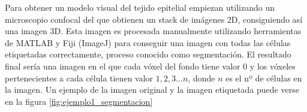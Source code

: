 
Para obtener un modelo visual del tejido epitelial empiezan utilizando un microscopio confocal del que obtienen un stack de imágenes 2D, consiguiendo así una imagen 3D. Esta imagen es procesada manualmente utilizando herramientas de MATLAB y Fiji (ImageJ) para conseguir una imagen con todas las células etiquetadas correctamente, proceso conocido como segmentación. El resultado final sería una imagen en el que cada vóxel del fondo tiene valor 0 y los vóxeles pertenecientes a cada célula tienen valor $1,2,3...n$, donde $n$ es el nº de células en la imagen. Un ejemplo de la imagen original y la imagen etiquetada puede verse en la figura \ref{fig:ejemplo1_segmentacion}

